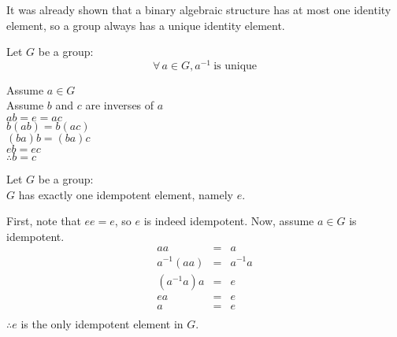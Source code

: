 \documentclass[letterpaper,12pt,fleqn]{article}
\begin{document}
It was already shown that a binary algebraic structure has at most one identity
element, so a group always has a unique identity element.

\begin{theorem}
  Let $G$ be a group:
  \[\forall\,a\in G,a^{-1}\ \mbox{is unique}\]
\end{theorem}

\begin{theproof}
  Assume $a\in G$ \\
  Assume $b$ and $c$ are inverses of $a$ \\
  $ab=e=ac$ \\
  $b(ab)=b(ac)$ \\
  $(ba)b=(ba)c$ \\
  $eb=ec$ \\
  $\therefore b=c$
\end{theproof}
\newpage
\begin{theorem}
  Let $G$ be a group: \\
  $G$ has exactly one idempotent element, namely $e$.
\end{theorem}

\begin{theproof}
  First, note that $ee=e$, so $e$ is indeed idempotent.
  Now, assume $a\in G$ is idempotent.
  \begin{eqnarray*}
    aa &=& a \\
    a^{-1}(aa) &=& a^{-1}a \\
    (a^{-1}a)a &=& e \\
    ea &=& e \\
    a &=& e \\
  \end{eqnarray*}
  $\therefore e$ is the only idempotent element in $G$.
\end{theproof}
\end{document}
